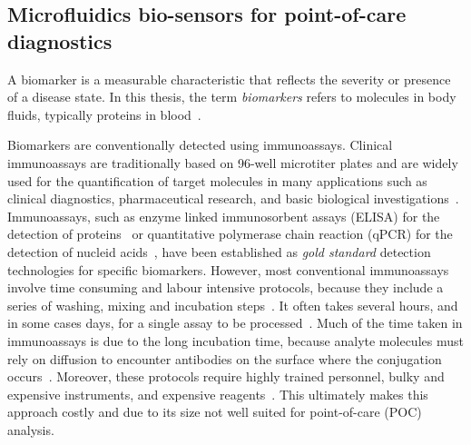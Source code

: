 \subsection{Microfluidics bio-sensors for point-of-care diagnostics}
\label{subsec:microfluidicsForBiomarkerAnalysis}
A biomarker is a measurable characteristic that reflects the severity or presence of a disease state. In this thesis, the term \textit{biomarkers} refers to molecules in body fluids, typically proteins in blood~\cite{Strimbu2010}. 


Biomarkers are conventionally detected using immunoassays. Clinical immunoassays are traditionally based on 96-well microtiter plates and are widely used for the quantification of target molecules in many applications such as clinical diagnostics, pharmaceutical research, and basic biological investigations~\cite{Sauer2005,Spisak2007,Delamarche2005}. Immunoassays, such as enzyme linked immunosorbent assays (ELISA) for the detection of proteins~\cite{Yalow1996} or quantitative polymerase chain reaction (qPCR) for the detection of nucleid acids~\cite{Chen2005}, have been established as \textit{gold standard} detection technologies for specific biomarkers. However, most conventional immunoassays involve time consuming and labour intensive protocols, because they include a series of washing, mixing and incubation steps~\cite{Sittampalam2004}. It often takes several hours, and in some cases days, for a single assay to be processed~\cite{Plitnick2013}. Much of the time taken in immunoassays is due to the long incubation time, because analyte molecules must rely on diffusion to encounter antibodies on the surface where the conjugation occurs~\cite{Rossier2001}. Moreover, these protocols require highly trained personnel, bulky and expensive instruments, and expensive reagents~\cite{Gossett2010}. This ultimately makes this approach costly and due to its size not well suited for point-of-care (POC) analysis.


